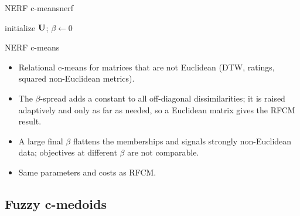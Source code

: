 \begin{algobox}{NERF c-means}{nerf}
\begin{algorithm}[H]
initialize $\mathbf{U}$; $\beta\leftarrow0$\;
\end{algorithm}
\end{algobox}
\begin{summarybox}{NERF c-means}
\begin{itemize}
  \item Relational c-means for matrices that are not Euclidean (DTW, ratings, squared non-Euclidean metrics).
  \item The $\beta$-spread adds a constant to all off-diagonal dissimilarities; it is raised adaptively and only as far as needed, so a Euclidean matrix gives the RFCM result.
  \item A large final $\beta$ flattens the memberships and signals strongly non-Euclidean data; objectives at different $\beta$ are not comparable.
  \item Same parameters and costs as RFCM.
\end{itemize}
\end{summarybox}

\subsection{Fuzzy c-medoids}\label{sec:rel:fcmdd}

